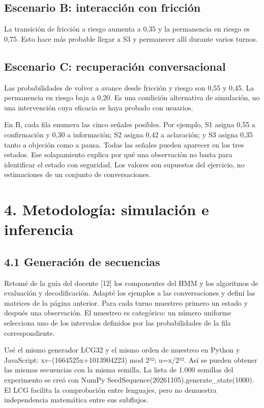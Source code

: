 \documentclass[10pt,a4paper]{article}
\begin{document}
\subsection*{Escenario B: interacción con fricción}
La transición de fricción a riesgo aumenta a 0,35 y la permanencia en riesgo es 0,75. Esto hace más probable llegar a S3 y permanecer allí durante varios turnos.


\subsection*{Escenario C: recuperación conversacional}
Las probabilidades de volver a avance desde fricción y riesgo son 0,55 y 0,45. La permanencia en riesgo baja a 0,20. Es una condición alternativa de simulación, no una intervención cuya eficacia se haya probado con usuarios.


En B, cada fila enumera las cinco señales posibles. Por ejemplo, S1 asigna 0,55 a confirmación y 0,30 a información; S2 asigna 0,42 a aclaración; y S3 asigna 0,35 tanto a objeción como a pausa. Todas las señales pueden aparecer en los tres estados. Ese solapamiento explica por qué una observación no basta para identificar el estado con seguridad. Los valores son supuestos del ejercicio, no estimaciones de un conjunto de conversaciones.


\clearpage
\section*{4. Metodología: simulación e inferencia}
\subsection*{4.1 Generación de secuencias}
Retomé de la guía del docente [12] los componentes del HMM y los algoritmos de evaluación y decodificación. Adapté los ejemplos a las conversaciones y definí las matrices de la página anterior. Para cada turno muestreo primero un estado y después una observación. El muestreo es categórico: un número uniforme selecciona uno de los intervalos definidos por las probabilidades de la fila correspondiente.


Usé el mismo generador LCG32 y el mismo orden de muestreo en Python y JavaScript: x←(1664525x+1013904223) mod 2³²; u=x/2³². Así se pueden obtener las mismas secuencias con la misma semilla. La lista de 1.000 semillas del experimento se creó con NumPy SeedSequence(20261105).generate\_state(1000). El LCG facilita la comprobación entre lenguajes, pero no demuestra independencia matemática entre sus subflujos.
\end{document}
